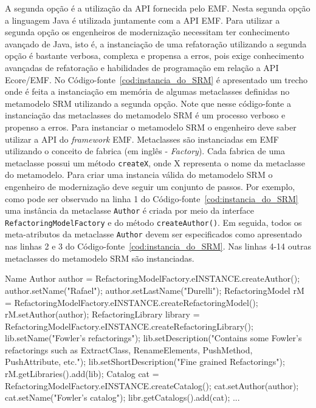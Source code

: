 A segunda opção é a utilização da API fornecida pelo EMF. Nesta segunda opção a linguagem Java é utilizada juntamente com a API EMF. Para utilizar a segunda opção os engenheiros de modernização necessitam ter conhecimento avançado de Java, isto é, a instanciação de uma refatoração utilizando a segunda opção é bastante verbosa, complexa e propensa a erros, pois exige conhecimento avançadas de refatoração e habilidades de programação em relação a API Ecore/EMF. No Código-fonte~\ref{cod:instancia_do_SRM} é apresentado um trecho onde é feita a instanciação em memória de algumas metaclasses definidas no metamodelo SRM utilizando a segunda opção. Note que nesse código-fonte a instanciação das metaclasses do metamodelo SRM é um processo verboso e propenso a erros. Para instanciar o metamodelo SRM o engenheiro deve saber utilizar a API do \textit{framework} EMF. Metaclasses são instanciadas em EMF utilizando o conceito de fabrica (em inglês - \textit{Factory}). Cada fabrica de uma metaclasse possui um método \texttt{createX}, onde X representa o nome da metaclasse do metamodelo. Para criar uma instancia válida do metamodelo SRM o engenheiro de modernização deve seguir um conjunto de passos. Por exemplo, como pode ser observado na linha 1 do Código-fonte~\ref{cod:instancia_do_SRM} uma instância da metaclasse \texttt{Author} é criada por meio da interface \texttt{RefactoringModelFactory} e do método \texttt{createAuthor()}. Em seguida, todos os meta-atributos da metaclasse \texttt{Author} devem ser especificados como apresentado nas linhas 2 e 3 do Código-fonte~\ref{cod:instancia_do_SRM}. Nas linhas 4-14 outras metaclasses do metamodelo SRM são instanciadas. 

\begin{codigo}[caption={[Instanciação do metamodelo SRM programaticamente.] Instanciação do metamodelo SRM.},escapeinside={(*@}{@*)}, basicstyle=\footnotesize, label={cod:instancia_do_SRM}, language=Java]{Name}
Author author = RefactoringModelFactory.eINSTANCE.createAuthor();
author.setName("Rafael");
author.setLastName("Durelli");
RefactoringModel rM = RefactoringModelFactory.eINSTANCE.createRefactoringModel();
rM.setAuthor(author);
RefactoringLibrary library = RefactoringModelFactory.eINSTANCE.createRefactoringLibrary();
lib.setName("Fowler's refactorings");
lib.setDescription("Contains some Fowler's refactorings such as ExtractClass, RenameElements, PushMethod, PushAttribute, etc.");
lib.setShortDescription("Fine grained Refactorings");
rM.getLibraries().add(lib);
Catalog cat = RefactoringModelFactory.eINSTANCE.createCatalog();
cat.setAuthor(author);
cat.setName("Fowler's catalog");
libr.getCatalogs().add(cat);
...
\end{codigo}

